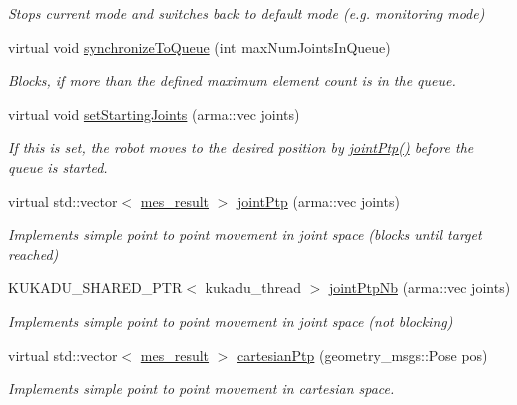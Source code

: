 \begin{DoxyCompactItemize}
\begin{DoxyCompactList}\small\item\em Stops current mode and switches back to default mode (e.\-g. monitoring mode) \end{DoxyCompactList}\item 
virtual void \hyperlink{classkukadu_1_1ControlQueue_a324484e79a5505656a32d9f32054e5d0}{synchronize\-To\-Queue} (int max\-Num\-Joints\-In\-Queue)
\begin{DoxyCompactList}\small\item\em Blocks, if more than the defined maximum element count is in the queue. \end{DoxyCompactList}\item 
virtual void \hyperlink{classkukadu_1_1ControlQueue_a225130ca0fa4a22e98cc0e5679917841}{set\-Starting\-Joints} (arma\-::vec joints)
\begin{DoxyCompactList}\small\item\em If this is set, the robot moves to the desired position by \hyperlink{classkukadu_1_1ControlQueue_ad11059100321b24a1af8ef7de8314353}{joint\-Ptp()} before the queue is started. \end{DoxyCompactList}\item 
virtual std\-::vector$<$ \hyperlink{structmes__result}{mes\-\_\-result} $>$ \hyperlink{classkukadu_1_1ControlQueue_ad11059100321b24a1af8ef7de8314353}{joint\-Ptp} (arma\-::vec joints)
\begin{DoxyCompactList}\small\item\em Implements simple point to point movement in joint space (blocks until target reached) \end{DoxyCompactList}\item 
K\-U\-K\-A\-D\-U\-\_\-\-S\-H\-A\-R\-E\-D\-\_\-\-P\-T\-R$<$ kukadu\-\_\-thread $>$ \hyperlink{classkukadu_1_1ControlQueue_aaf35ae626b08ac53508acdc84ab58c8f}{joint\-Ptp\-Nb} (arma\-::vec joints)
\begin{DoxyCompactList}\small\item\em Implements simple point to point movement in joint space (not blocking) \end{DoxyCompactList}\item 
virtual std\-::vector$<$ \hyperlink{structmes__result}{mes\-\_\-result} $>$ \hyperlink{classkukadu_1_1ControlQueue_a1bfa23a8ce6319f6ef0ed9208e896054}{cartesian\-Ptp} (geometry\-\_\-msgs\-::\-Pose pos)
\begin{DoxyCompactList}\small\item\em Implements simple point to point movement in cartesian space. \end{DoxyCompactList}\item 

\end{DoxyCompactItemize}
